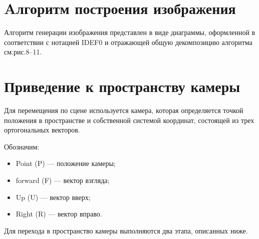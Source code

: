 \section{Aлгоритм построения изображения}

Алгоритм генерации изображения представлен в виде диаграммы, оформленной в соответствии с нотацией IDEF0 и отражающей общую декомпозицию алгоритма см.рис.8--11. 

\newpage

\newpage

\newpage

\newpage

\section{Приведение к пространству камеры}

Для перемещения по сцене используется камера, которая определяется точкой положения в пространстве и собственной системой координат, состоящей из трех ортогональных векторов.

Обозначим:
\begin{itemize}
	\item Point (P) --- положение камеры;
	\item forward (F) --- вектор взгляда;
	\item Up (U) --- вектор вверх;
	\item Right (R) --- вектор вправо.
\end{itemize}

Для перехода в пространство камеры выполняются два этапа, описанных ниже.

